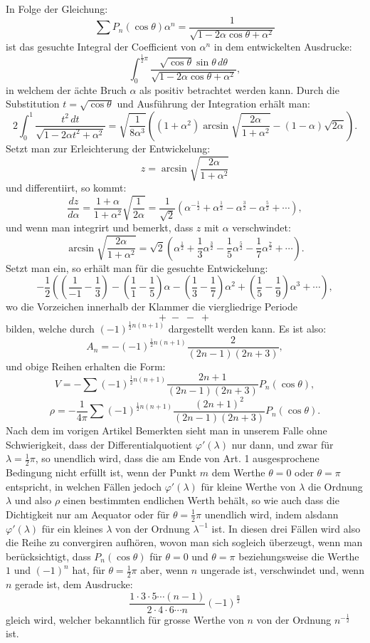 \documentclass[11pt]{article}
\newcommand{\dd}{\,d}
\begin{document}
In Folge der Gleichung:
\[
 \sum P_n(\cos\theta)\alpha^n=\frac1{\sqrt{1-2\alpha\cos\theta+\alpha^2}}
\]
ist das gesuchte Integral der Coefficient von $\alpha^n$ in dem entwickelten Ausdrucke:
\[
 \int_0^{\frac12\pi}\frac{\sqrt{\cos\theta}\sin\theta\dd\theta}{\sqrt{1-2\alpha\cos\theta+\alpha^2}},
\]
in welchem der ächte Bruch $\alpha$ als positiv betrachtet werden kann. Durch die Substitution $t=\sqrt{\cos\theta}$ und Ausführung der Integration erhält man:
\[
 2\int_0^1\frac{t^2\dd t}{\sqrt{1-2\alpha t^2+\alpha^2}}
 =\sqrt{\frac1{8\alpha^3}}\left((1+\alpha^2)\arcsin\sqrt{\frac{2\alpha}{1+\alpha^2}}-(1-\alpha)\sqrt{2\alpha}\right).
\]
Setzt man zur Erleichterung der Entwickelung:
\[
 z=\arcsin\sqrt{\frac{2\alpha}{1+\alpha^2}}
\]
und differentiirt, so kommt:
\[
 \frac{dz}{d\alpha}=\frac{1+\alpha}{1+\alpha^2}\sqrt{\frac1{2\alpha}}
 =\frac1{\sqrt2}(\alpha^{-\frac12}+\alpha^{\frac12}-\alpha^{\frac32}-\alpha^{\frac52}+\cdots),
\]
und wenn man integrirt und bemerkt, dass $z$ mit $\alpha$ verschwindet:
\[
 \arcsin\sqrt{\frac{2\alpha}{1+\alpha^2}}
 =\sqrt2\left(\alpha^{\frac12}+\frac13\alpha^{\frac32}-\frac15\alpha^{\frac52}-\frac17\alpha^{\frac72}+\cdots\right).
\]
Setzt man ein, so erhält man für die gesuchte Entwickelung:
\[
 -\frac12\left(\left(\frac1{-1}-\frac13\right)-\left(\frac11-\frac15\right)\alpha-
 \left(\frac13-\frac17\right)\alpha^2+\left(\frac15-\frac19\right)\alpha^3+\cdots\right),
\]
wo die Vorzeichen innerhalb der Klammer die viergliedrige Periode
\[
 +\; -\; -\; +
\]
bilden, welche durch $(-1)^{\frac12 n(n+1)}$ dargestellt werden kann. Es ist also:
\[
 A_n=-(-1)^{\frac12 n(n+1)}\frac{2}{(2n-1)(2n+3)},
\]
und obige Reihen erhalten die Form:
\[
 V=-\sum (-1)^{\frac12 n(n+1)}\frac{2n+1}{(2n-1)(2n+3)}P_n(\cos\theta),
\]
\[
 \rho=-\frac1{4\pi}\sum (-1)^{\frac12 n(n+1)}\frac{(2n+1)^2}{(2n-1)(2n+3)}P_n(\cos\theta).
\]
Nach dem im vorigen Artikel Bemerkten sieht man in unserem Falle ohne Schwierigkeit, dass der Differentialquotient $\varphi'(\lambda)$ nur dann, und zwar für $\lambda=\frac12\pi$, so unendlich wird, dass die am Ende von Art. 1 ausgesprochene Bedingung nicht erfüllt ist, wenn der Punkt $m$ dem Werthe $\theta=0$ oder $\theta=\pi$ entspricht, in welchen Fällen jedoch $\varphi'(\lambda)$ für kleine Werthe von $\lambda$ die Ordnung $\lambda$ und also $\rho$ einen bestimmten endlichen Werth behält, so wie auch dass die Dichtigkeit nur am Aequator oder für $\theta=\frac12\pi$ unendlich wird, indem alsdann $\varphi'(\lambda)$ für ein kleines $\lambda$ von der Ordnung $\lambda^{-1}$ ist. In diesen drei Fällen wird also die Reihe zu convergiren aufhören, wovon man sich sogleich überzeugt, wenn man berücksichtigt, dass $P_n(\cos\theta)$ für $\theta=0$ und $\theta=\pi$ beziehungsweise die Werthe $1$ und $(-1)^n$ hat, für $\theta=\frac12\pi$ aber, wenn $n$ ungerade ist, verschwindet und, wenn $n$ gerade ist, dem Ausdrucke:
\[
 \frac{1\cdot3\cdot5\cdots(n-1)}{2\cdot4\cdot6\cdots n}(-1)^{\frac n2}
\]
gleich wird, welcher bekanntlich für grosse Werthe von $n$ von der Ordnung $n^{-\frac12}$ ist.
\end{document}
